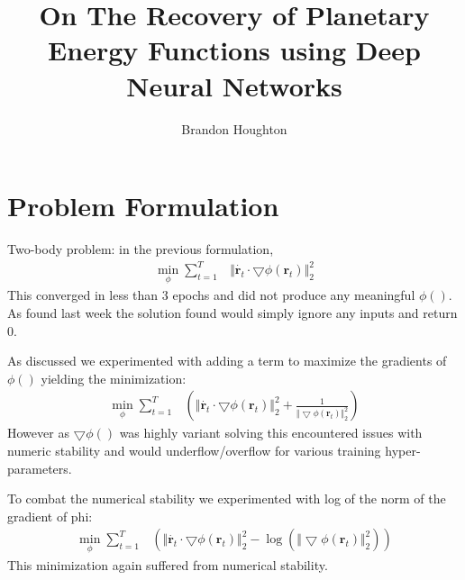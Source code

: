 \documentclass[10pt,letterpaper]{report}
\title{On The Recovery of Planetary Energy Functions using Deep Neural Networks}
\author{Brandon Houghton}
\begin{document}
\maketitle

\section{Problem Formulation}

Two-body problem: in the previous formulation,
\begin{align}
\min_{\phi} \sum^{T}_{t = 1} & \Vert \dot{\pmb{r}_t} \cdot \bigtriangledown \phi \left( \pmb{r}_t \right) \Vert^2_2
\end{align}
This converged in less than 3 epochs and did not produce any meaningful $\phi()$. As found last week the solution found would simply ignore any inputs and return $0$.


As discussed we experimented with adding a term to maximize the gradients of $\phi()$ yielding the minimization: 
\begin{align}
\min_{\phi} \sum^{T}_{t = 1} & \left( \Vert \dot{\pmb{r}_t} \cdot \bigtriangledown \phi \left( \pmb{r}_t \right) \Vert^2_2 + \frac{1}{\Vert \bigtriangledown \phi \left( \pmb{r}_t \right) \Vert^2_2} \right)
\end{align}
However as $\bigtriangledown\phi()$ was highly variant solving this encountered issues with numeric stability and would underflow/overflow for various training hyper-parameters.


To combat the numerical stability we experimented with log of the norm of the gradient of phi:
\begin{align}
\min_{\phi} \sum^{T}_{t = 1} & \left( \Vert \dot{\pmb{r}_t} \cdot \bigtriangledown \phi \left( \pmb{r}_t \right) \Vert^2_2 -
\log{ \left( \Vert \bigtriangledown \phi \left( \pmb{r}_t \right) \Vert^2_2 \right)} \right)
\end{align}
This minimization again suffered from numerical stability.
\end{document}
